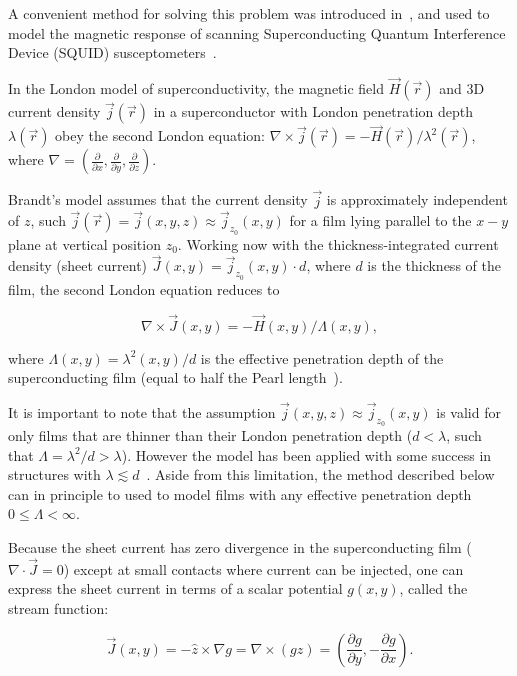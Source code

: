 \documentclass{article}
\begin{document}
A convenient method for solving this problem was introduced in~\cite{brandt_thin_2005}, and used to model the magnetic response of scanning Superconducting Quantum Interference Device (SQUID) susceptometers~\cite{kirtley_scanning_2016, kirtley_response_2016}.

In the London model of superconductivity, the magnetic field $\vec{H}(\vec{r})$ and 3D current density $\vec{j}(\vec{r})$ in a superconductor with London penetration depth $\lambda(\vec{r})$ obey the second London equation:
$\nabla\times\vec{j}(\vec{r})=-\vec{H}(\vec{r})/\lambda^2(\vec{r})$, where
$\nabla=\left(\frac{\partial}{\partial x}, \frac{\partial}{\partial y}, \frac{\partial}{\partial z}\right)$.

Brandt's model assumes that the current density $\vec{j}$ is approximately independent of $z$, such $\vec{j}(\vec{r}) = \vec{j}(x, y, z)\approx\vec{j}_{z_0}(x, y)$ for a film lying parallel to the $x-y$ plane at vertical position $z_0$. Working now with the thickness-integrated current density (sheet current) $\vec{J}(x, y)=\vec{j}_{z_0}(x, y)\cdot d$, where $d$
is the thickness of the film, the second London equation reduces to

\begin{equation}
    \label{eq:london}
    \nabla\times\vec{J}(x, y)=-\vec{H}(x, y)/\Lambda(x, y),
\end{equation}

where $\Lambda(x, y)=\lambda^2(x, y)/d$ is the effective penetration depth
of the superconducting film (equal to half the Pearl length~\cite{pearl_current_1964}).

It is important to note that the assumption $\vec{j}(x, y, z)\approx\vec{j}_{z_0}(x, y)$ is valid for only films that are thinner than their London penetration depth ($d<\lambda$, such that $\Lambda=\lambda^2/d>\lambda$). However the model has been applied with some success in structures with $\lambda\lesssim d$~\cite{kirtley_scanning_2016,kirtley_response_2016}. Aside from this limitation, the method described below can in principle to used to model films with any effective penetration depth $0\leq\Lambda<\infty$.

Because the sheet current has zero divergence in the superconducting film ($\nabla\cdot\vec{J}=0$)
except at small contacts where current can be injected, one can express the sheet current in terms
of a scalar potential $g(x, y)$, called the stream function:

\begin{equation}
    \label{eq:stream}
    \vec{J}(x, y) = -\hat{z}\times\nabla g
    = \nabla\times(g\hat{z})
    = \left(\frac{\partial g}{\partial y}, -\frac{\partial g}{\partial x}\right).
\end{equation}
\end{document}
